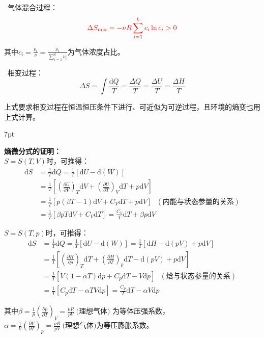 \documentclass[zihao=-4,UTF8]{report}
\newenvironment{graybox}{%
\def\FrameCommand{%
\hspace{1pt}%
{\color{gray}\small \vrule width 2pt}%
{\color{graybox_color}\vrule width 4pt}%
\colorbox{graybox_color}%
}%
\MakeFramed{\advance\hsize-\width\FrameRestore}%
\noindent\hspace{-4.55pt}%
\begin{adjustwidth}{}{7pt}%
\vspace{2pt}\vspace{2pt}%
}
{%
\vspace{2pt}\end{adjustwidth}\endMakeFramed%
}
\begin{document}
\noindent{}\ 气体混合过程：
\begin{equation}
    {\color{red}\Delta S_{\text{mix}} = - \nu R \sum_{i=1}^{k}c_i\ln c_i >0}
\end{equation}
{\par\color{gray}\small
其中$c_i = \frac{\nu_i}{\nu} = \frac{\nu_i}{\sum_{i=1}^{k}\nu_i}$为气体浓度占比。
\par}
\noindent{}\ 相变过程：
\begin{equation}
    \Delta S = \int \frac{\mathrm{d}Q}{T} = \frac{\Delta Q}{T} =  \frac{\Delta U}{T} =  \frac{\Delta H}{T}
\end{equation}
{\par\color{gray}\small
上式要求相变过程在恒温恒压条件下进行、可近似为可逆过程，且环境的熵变也用上式计算。
\par}

\begin{graybox}
    \textbf{熵微分式的证明：}\\
    $S = S(T,V)$时，可推得：
    \begin{align*}
        \mathrm{d}S &= \frac{1}{T}\mathrm{d}Q = \frac{1}{T}\left[\mathrm{d}U - \mathrm{d}(W)\right]\\
        & = \frac{1}{T}\left[  \left(\frac{\partial U}{\partial V} \right)_T\mathrm{d}V + \left(\frac{\partial U}{\partial T} \right)_V\mathrm{d}T   + p\mathrm{d}V\right]\\
        &= \frac{1}{T} \left[ p(\beta  T-1)\mathrm{d}V+ C_V\mathrm{d}T + p\mathrm{d}V \right] \ \ \ (\text{内能与状态参量的关系})\\
        & = \frac{1}{T}\left[ \beta  pT\mathrm{d}V+ C_V\mathrm{d}T \right] =  \frac{C_V}{T}\mathrm{d}T + \beta  p \mathrm{d}V
    \end{align*}\par
    $S = S(T,p)$时，可推得：
    \begin{align*}
        \mathrm{d}S &= \frac{1}{T}\mathrm{d}Q 
        = \frac{1}{T}\left[\mathrm{d}U - \mathrm{d}(W)\right]
        = \frac{1}{T}\left[ \mathrm{d}H - \mathrm{d}(pV)   + p\mathrm{d}V\right]  \\
        &= \frac{1}{T}\left[ \left(\frac{\partial H}{\partial p} \right)_T\mathrm{d}T + \left(\frac{\partial H}{\partial T} \right)_p\mathrm{d}T - \mathrm{d}(pV)   + p\mathrm{d}V\right]\\
        &= \frac{1}{T} \left[ V(1- \alpha T)\mathrm{d}p+ C_p\mathrm{d}T - V\mathrm{d}p \right] \ \ \ (\text{焓与状态参量的关系})\\
        & = \frac{1}{T}\left[   C_p\mathrm{d}T - \alpha TV\mathrm{d}p \right] = \frac{C_p}{T}\mathrm{d}T - \alpha V\mathrm{d}p
    \end{align*}\par
    其中$\beta = \frac{1}{p}\left(\frac{\partial p}{\partial T} \right)_V = \frac{\nu R}{pV}\ \text{(理想气体)}$ 为等体压强系数，$\alpha= \frac{1}{V}\left(\frac{\partial V}{\partial T} \right)_p = \frac{\nu R}{pV} \ \text{(理想气体)}$为等压膨胀系数。
\end{graybox}
    
\end{document}
